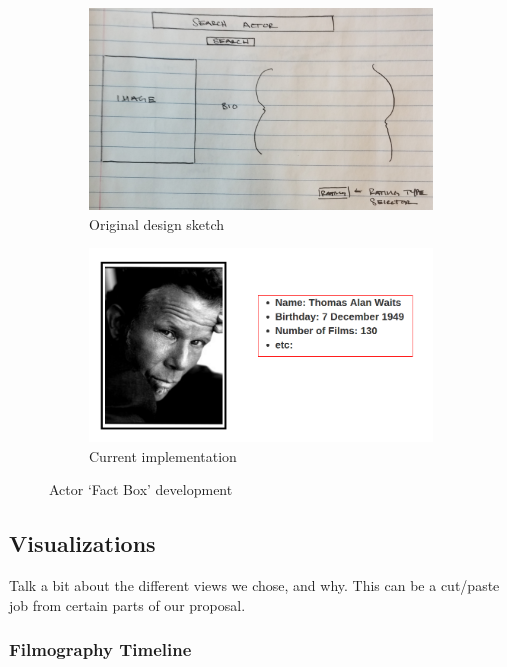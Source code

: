 \documentclass[12pt]{article}
\begin{document}
		\begin{figure}[h!]
			\centering
			\begin{subfigure}[t]{.5\textwidth}
				  \centering
				  \includegraphics[width=\linewidth]{images/actorFactBox_crop.png}
				  \caption{Original design sketch}
				  \label{fig:sub1}
			\end{subfigure}%
			\begin{subfigure}[t]{.5\textwidth}
				  \centering
				  \includegraphics[width=.8\linewidth]{images/actorBox.png}
				  \caption{Current implementation}
				  \label{fig:sub2}
			\end{subfigure}%
			\caption{Actor `Fact Box' development}
			\label{fig:actorFactBox}
		\end{figure}

\subsection{Visualizations}

	Talk a bit about the different views we chose, and why.  This can be a cut/paste job from certain parts of our proposal.

\subsubsection{Filmography Timeline}
\end{document}
